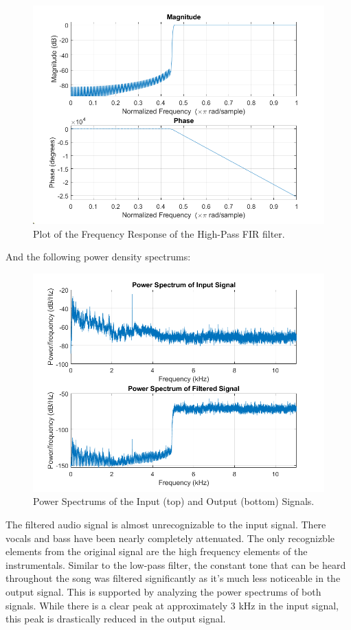 \documentclass[a4paper, 10pt]{article}
\begin{document}
\begin{figure}[H]
  \centering
  \includegraphics[width=13cm]{images/q2_b.png}
  \caption{Plot of the Frequency Response of the High-Pass FIR filter.}
\end{figure}
\noindent And the following power density spectrums:
\begin{figure}[H]
  \centering
  \includegraphics[width=13cm]{images/q2_e.png}
  \caption{Power Spectrums of the Input (top) and Output (bottom) Signals.}
\end{figure}
\noindent The filtered audio signal is almost unrecognizable to the input signal. There vocals and bass have been nearly completely
attenuated. The only recognizble elements from the original signal are the high frequency elements of the instrumentals.
Similar to the low-pass filter, the constant tone that can be heard throughout the song was filtered
significantly as it's much less noticeable in the output signal. This is supported by analyzing the power spectrums of
both signals. While there is a clear peak at approximately 3 kHz in the input signal, this peak is drastically reduced
in the output signal.
  
\end{document}
